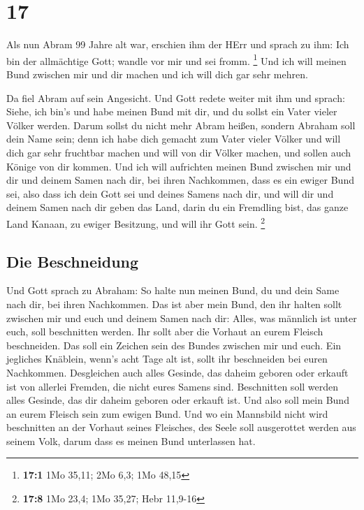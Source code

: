 \hypertarget{section-16}{%
\section{17}\label{section-16}}

 Als nun Abram 99 Jahre alt war, erschien ihm der HErr und
sprach zu ihm: Ich bin der allmächtige Gott; wandle vor mir und sei
fromm. \footnote{\textbf{17:1} 1Mo 35,11; 2Mo 6,3; 1Mo 48,15}
 Und ich will meinen Bund zwischen mir und dir machen und
ich will dich gar sehr mehren.

 Da fiel Abram auf sein Angesicht. Und Gott redete weiter
mit ihm und sprach:  Siehe, ich bin's und habe meinen Bund
mit dir, und du sollst ein Vater vieler Völker werden. 
Darum sollst du nicht mehr Abram heißen, sondern Abraham soll dein Name
sein; denn ich habe dich gemacht zum Vater vieler Völker 
und will dich gar sehr fruchtbar machen und will von dir Völker machen,
und sollen auch Könige von dir kommen.  Und ich will
aufrichten meinen Bund zwischen mir und dir und deinem Samen nach dir,
bei ihren Nachkommen, dass es ein ewiger Bund sei, also dass ich dein
Gott sei und deines Samens nach dir,  und will dir und
deinem Samen nach dir geben das Land, darin du ein Fremdling bist, das
ganze Land Kanaan, zu ewiger Besitzung, und will ihr Gott sein.
\footnote{\textbf{17:8} 1Mo 23,4; 1Mo 35,27; Hebr 11,9-16}

\hypertarget{die-beschneidung}{%
\subsection{Die Beschneidung}\label{die-beschneidung}}

 Und Gott sprach zu Abraham: So halte nun meinen Bund, du
und dein Same nach dir, bei ihren Nachkommen.  Das ist
aber mein Bund, den ihr halten sollt zwischen mir und euch und deinem
Samen nach dir: Alles, was männlich ist unter euch, soll beschnitten
werden.  Ihr sollt aber die Vorhaut an eurem Fleisch
beschneiden. Das soll ein Zeichen sein des Bundes zwischen mir und euch.
 Ein jegliches Knäblein, wenn's acht Tage alt ist, sollt
ihr beschneiden bei euren Nachkommen. Desgleichen auch alles Gesinde,
das daheim geboren oder erkauft ist von allerlei Fremden, die nicht
eures Samens sind.  Beschnitten soll werden alles
Gesinde, das dir daheim geboren oder erkauft ist. Und also soll mein
Bund an eurem Fleisch sein zum ewigen Bund.  Und wo ein
Mannsbild nicht wird beschnitten an der Vorhaut seines Fleisches, des
Seele soll ausgerottet werden aus seinem Volk, darum dass es meinen Bund
unterlassen hat.

